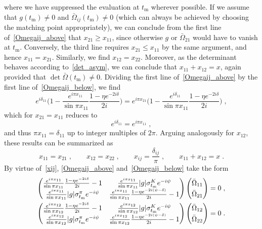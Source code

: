 \documentclass[11pt]{article}%
\providecommand{\ec}{\;,}
\providecommand{\ep}{\;.}
\providecommand{\nt}{\notag}
\newcommand{\tm}{t_\text{m}}
\newcommand{\beq}{\begin{equation}}
\newcommand{\eeq}{\end{equation}}
\begin{document}
where we have suppressed the evaluation at $\tm$ wherever possible. If we assume that $g(\tm)\neq 0$ and $\bar \Omega_{ij}(\tm)\neq 0$ (which can always be achieved by choosing the matching point appropriately), we can conclude from the first line of~\eqref{Omegaij_above} that $x_{21}\geq x_{11}$, since otherwise $g$ or $\bar\Omega_{21}$ would have to vanish at $\tm$. Conversely, the third line requires $x_{21}\leq x_{11}$ by the same argument, and hence $x_{11}=x_{21}$. Similarly, we find $x_{12}=x_{22}$. Moreover, as the determinant behaves according to~\eqref{det_asym}, we can conclude that $x_{11}+x_{12}=x$, again provided that $\det\bar\Omega (\tm)\neq0$. Dividing the first line of~\eqref{Omegaij_above} by the first line of~\eqref{Omegaij_below}, we find 
\beq
e^{i\delta_{11}}\bigg(1-\frac{e^{i\pi x_{11}}}{\sin\pi x_{11}}\frac{1-\eta e^{-2i\delta}}{2i}\bigg)
=e^{i\pi x_{21}}\bigg(1-\frac{e^{i\delta_{11}}}{\sin\pi x_{11}}\frac{1-\eta e^{-2i\delta}}{2i}\bigg)\ec
\eeq
which for $x_{21}=x_{11}$ reduces to
\beq
e^{i\delta_{11}}=e^{i\pi x_{11}}\ec
\eeq
and thus $\pi x_{11}=\delta_{11}$ up to integer multiples of $2\pi$.  
Arguing analogously for $x_{12}$, these results can be summarized as
\beq
\label{xij}
x_{11}=x_{21}\ec\qquad x_{12}=x_{22}\ec\qquad x_{ij}=\frac{\delta_{ij}}{\pi}\ec \qquad x_{11}+x_{12}=x\ep
\eeq
By virtue of~\eqref{xij}, \eqref{Omegaij_above} and~\eqref{Omegaij_below} take the form
\begin{align}
\label{spectral_rep_const}
\renewcommand{\arraystretch}{1.3}
 \begin{pmatrix}
 \frac{e^{i\pi x_{11}}}{\sin\pi x_{11}}\frac{1-\eta e^{-2i\delta}}{2i}-1 & \frac{e^{i\pi x_{11}}}{\sin\pi x_{11}}|g|\sigma_{\tm}^K e^{-i\psi}\\
\frac{e^{i\pi x_{11}}}{\sin\pi x_{11}}|g|\sigma_{\tm}^\pi e^{-i\psi} & \frac{e^{i\pi x_{11}}}{\sin\pi x_{11}}\frac{1-\eta e^{-2i(\psi-\delta)}}{2i}-1
\end{pmatrix}
\begin{pmatrix}
 \bar\Omega_{11}\\ 
\bar\Omega_{21}
\end{pmatrix}
&=0\ec\nt\\
%
\renewcommand{\arraystretch}{1.3}
 \begin{pmatrix}
 \frac{e^{i\pi x_{12}}}{\sin\pi x_{12}}\frac{1-\eta e^{-2i\delta}}{2i}-1 & \frac{e^{i\pi x_{12}}}{\sin\pi x_{12}}|g|\sigma_{\tm}^K e^{-i\psi}\\
\frac{e^{i\pi x_{12}}}{\sin\pi x_{12}}|g|\sigma_{\tm}^\pi e^{-i\psi} & \frac{e^{i\pi x_{12}}}{\sin\pi x_{12}}\frac{1-\eta e^{-2i(\psi-\delta)}}{2i}-1
\end{pmatrix}
\begin{pmatrix}
 \bar\Omega_{12}\\ 
\bar\Omega_{22}
\end{pmatrix}
&=0\ep
\end{align}
\end{document}
